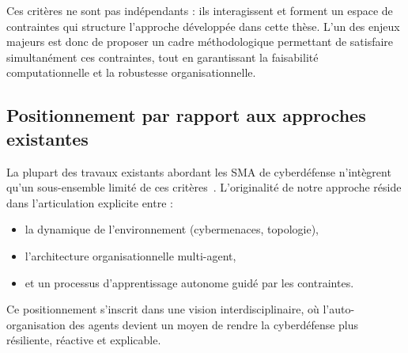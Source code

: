 \documentclass[ twoside,openright,titlepage,numbers=noenddot,headinclude,%
                footinclude=true,cleardoublepage=empty,abstractoff, %
                BCOR=5mm,paper=a4,fontsize=11pt,%
                french,american,%
                ]{scrreprt}
\begin{document}
Ces critères ne sont pas indépendants : ils interagissent et forment un espace de contraintes qui structure l'approche développée dans cette thèse. L'un des enjeux majeurs est donc de proposer un cadre méthodologique permettant de satisfaire simultanément ces contraintes, tout en garantissant la faisabilité computationnelle et la robustesse organisationnelle.

\subsection*{Positionnement par rapport aux approches existantes}

La plupart des travaux existants abordant les SMA de cyberdéfense n'intègrent qu'un sous-ensemble limité de ces critères~\cite{Smejkal2021cyberdefense, Kim2020rlcyberdefense}. L'originalité de notre approche réside dans l'articulation explicite entre :
\begin{itemize}
    \item la dynamique de l'environnement (cybermenaces, topologie),
    \item l'architecture organisationnelle multi-agent,
    \item et un processus d'apprentissage autonome guidé par les contraintes.
\end{itemize}

Ce positionnement s'inscrit dans une vision interdisciplinaire, où l'auto-organisation des agents devient un moyen de rendre la cyberdéfense plus résiliente, réactive et explicable.
\end{document}
